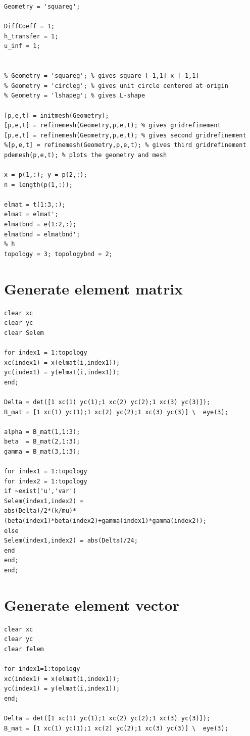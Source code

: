 \documentclass[a4paper]{report}
\begin{document}
\begin{appendices}
\begin{lstlisting}
Geometry = 'squareg'; 

DiffCoeff = 1;
h_transfer = 1;
u_inf = 1;


% Geometry = 'squareg'; % gives square [-1,1] x [-1,1]
% Geometry = 'circleg'; % gives unit circle centered at origin
% Geometry = 'lshapeg'; % gives L-shape

[p,e,t] = initmesh(Geometry);
[p,e,t] = refinemesh(Geometry,p,e,t); % gives gridrefinement
[p,e,t] = refinemesh(Geometry,p,e,t); % gives second gridrefinement
%[p,e,t] = refinemesh(Geometry,p,e,t); % gives third gridrefinement
pdemesh(p,e,t); % plots the geometry and mesh

x = p(1,:); y = p(2,:);
n = length(p(1,:));

elmat = t(1:3,:);
elmat = elmat';
elmatbnd = e(1:2,:);
elmatbnd = elmatbnd';
% h
topology = 3; topologybnd = 2;
\end{lstlisting}




\section{Generate element matrix}
\begin{lstlisting}
clear xc
clear yc
clear Selem

for index1 = 1:topology
xc(index1) = x(elmat(i,index1));
yc(index1) = y(elmat(i,index1));
end;

Delta = det([1 xc(1) yc(1);1 xc(2) yc(2);1 xc(3) yc(3)]);
B_mat = [1 xc(1) yc(1);1 xc(2) yc(2);1 xc(3) yc(3)] \  eye(3);

alpha = B_mat(1,1:3);
beta  = B_mat(2,1:3);
gamma = B_mat(3,1:3);

for index1 = 1:topology
for index2 = 1:topology
if ~exist('u','var')
Selem(index1,index2) =
abs(Delta)/2*(k/mu)*(beta(index1)*beta(index2)+gamma(index1)*gamma(index2));
else
Selem(index1,index2) = abs(Delta)/24;
end
end;
end;
\end{lstlisting}

\section{Generate element vector}
\begin{lstlisting}
clear xc
clear yc
clear felem

for index1=1:topology
xc(index1) = x(elmat(i,index1));
yc(index1) = y(elmat(i,index1));
end;

Delta = det([1 xc(1) yc(1);1 xc(2) yc(2);1 xc(3) yc(3)]);
B_mat = [1 xc(1) yc(1);1 xc(2) yc(2);1 xc(3) yc(3)] \  eye(3);


\end{lstlisting}
\end{appendices}
\end{document}
